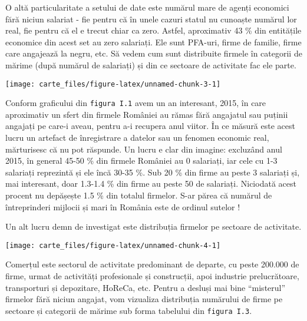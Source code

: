 \documentclass[
]{book}
\begin{document}
O altă particularitate a setului de date este numărul mare de agenți economici fără niciun salariat - fie pentru că în unele cazuri statul nu cunoaște numărul lor real, fie pentru că el e trecut chiar ca zero. Astfel, aproximativ 43 \% din entitățile economice din acest set au zero salariați. Ele sunt PFA-uri, firme de familie, firme care angajează la negru, etc. Să vedem cum sunt distribuite firmele în categorii de mărime (după numărul de salariați) și din ce sectoare de activitate fac ele parte.

\begin{center}\texttt{[image: carte\_files/figure-latex/unnamed-chunk-3-1]} \end{center}

Conform graficului din \texttt{figura\ I.1} avem un an interesant, 2015, în care aproximativ un sfert din firmele României au rămas fără angajatul sau puținii angajați pe care-i aveau, pentru a-i recupera anul viitor. În ce măsură este acest lucru un artefact de înregistrare a datelor sau un fenomen economic real, mărturisesc că nu pot răspunde. Un lucru e clar din imagine: excluzând anul 2015, în general 45-50 \% din firmele României au 0 salariați, iar cele cu 1-3 salariați reprezintă și ele încă 30-35 \%. Sub 20 \% din firme au peste 3 salariați și, mai interesant, doar 1.3-1.4 \% din firme au peste 50 de salariați. Niciodată acest procent nu depășește 1.5 \% din totalul firmelor. S-ar părea că numărul de întreprinderi mijlocii și mari în România este de ordinul sutelor !

Un alt lucru demn de investigat este distribuția firmelor pe sectoare de activitate.

\begin{center}\texttt{[image: carte\_files/figure-latex/unnamed-chunk-4-1]} \end{center}

Comerțul este sectorul de activitate predominant de departe, cu peste 200.000 de firme, urmat de activități profesionale și construcții, apoi industrie prelucrătoare, transporturi și depozitare, HoReCa, etc. Pentru a desluși mai bine ``misterul'' firmelor fără niciun angajat, vom vizualiza distribuția numărului de firme pe sectoare și categorii de mărime sub forma tabelului din \texttt{figura\ I.3}.
\end{document}
